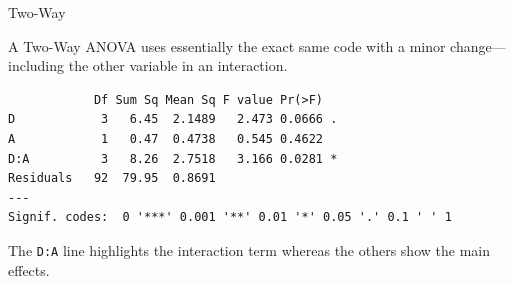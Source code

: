\begin{frame}[fragile]{Two-Way}

A Two-Way ANOVA uses essentially the exact same code with a minor
change---including the other variable in an interaction.

\begin{Shaded}
\begin{Highlighting}[]
\StringTok{ }\OperatorTok{~}\StringTok{ }\OperatorTok{*}\StringTok{ }
\end{Highlighting}
\end{Shaded}

\begin{verbatim}
            Df Sum Sq Mean Sq F value Pr(>F)  
D            3   6.45  2.1489   2.473 0.0666 .
A            1   0.47  0.4738   0.545 0.4622  
D:A          3   8.26  2.7518   3.166 0.0281 *
Residuals   92  79.95  0.8691                 
---
Signif. codes:  0 '***' 0.001 '**' 0.01 '*' 0.05 '.' 0.1 ' ' 1
\end{verbatim}

The \texttt{D:A} line highlights the interaction term whereas the others
show the main effects.

\end{frame}

